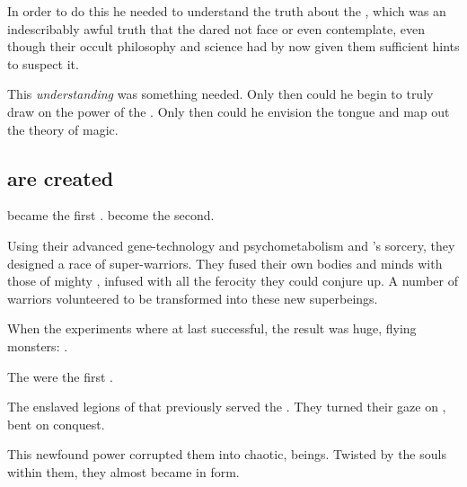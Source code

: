 In order to do this he needed to understand the truth about the , which was an indescribably awful truth that the \ophidians dared not face or even contemplate, even though their occult philosophy and science had by now given them sufficient hints to suspect it. 

This \emph{understanding} was something \Sethicus needed.
Only then could he begin to truly draw on the power of the \xss.
Only then could he envision the \TrueDraconic tongue and map out the \draconic theory of magic.







\subsection{\Dragons are created}
\Sethicus became the first \dragon.
\Tiamat become the second.

Using their advanced gene-technology and psychometabolism and \Sethicus's \xsic{} sorcery, they designed a race of \ophidian{} super-warriors. 
They fused their own \ophidian bodies and minds with those of mighty , infused with all the \xsic{} ferocity they could conjure up. 
A number of \ophidian{} warriors volunteered to be transformed into these new superbeings. 

When the experiments where at last successful, the result was huge, flying monsters: 
\Dragons. 

The \dragons were the first . 

The \dragons{} enslaved legions of \daemons{} that previously served the \xzaishanns. 
They turned their gaze on \Miith{}, bent on conquest.


This newfound power corrupted them into chaotic, \daemonic{} beings. Twisted by the \xzaishannic{} souls within them, they almost became \xzaishanns{} in \ophidian{} form. 





